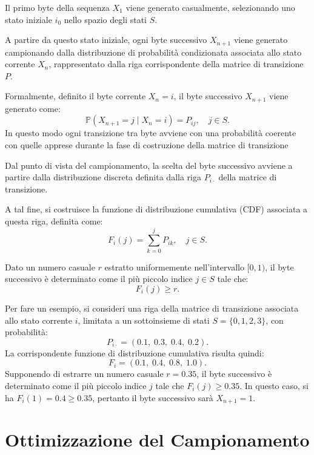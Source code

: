 \documentclass{report}
\begin{document}
\bigskip

Il primo byte della sequenza \(X_1\) viene generato casualmente, selezionando uno stato iniziale \(i_0\)
nello spazio degli stati \(S\).

A partire da questo stato iniziale, ogni byte successivo \(X_{n+1}\) viene generato campionando dalla
distribuzione di probabilità condizionata associata allo stato corrente \(X_n\), 
rappresentato dalla riga corrispondente della matrice di transizione \(P\).

\bigskip

Formalmente, definito il byte corrente \(X_n = i\), il byte successivo \(X_{n+1}\) viene generato come:
\[
\mathbb{P}(X_{n+1} = j \mid X_n = i) = P_{ij}, \quad j \in S.
\]
In questo modo ogni transizione tra byte avviene con
una probabilità coerente con quelle apprese durante la fase di costruzione della
matrice di transizione

\bigskip

Dal punto di vista del campionamento, la scelta del byte successivo avviene a partire 
dalla distribuzione discreta definita dalla riga \(P_{i\cdot}\) della
matrice di transizione.

A tal fine, si costruisce la funzione di distribuzione cumulativa (CDF) associata a questa riga, definita come:
\[
F_i(j) = \sum_{k = 0}^{j} P_{ik}, \quad j \in S.
\]

Dato un numero casuale \(r\) estratto uniformemente nell'intervallo \([0, 1)\),
il byte successivo è determinato come il più piccolo indice \(j \in S\) tale che:
\[
F_i(j) \geq r.
\]

\bigskip

Per fare un esempio, si consideri una riga della matrice di transizione
associata allo stato corrente \(i\), limitata a un sottoinsieme di stati
\(S = \{0,1,2,3\}\), con probabilità:
\[
P_{i\cdot} = (0.1,\; 0.3,\; 0.4,\; 0.2).
\]
La corrispondente funzione di distribuzione cumulativa risulta quindi:
\[
F_i = (0.1,\; 0.4,\; 0.8,\; 1.0).
\]
Supponendo di estrarre un numero casuale \(r = 0.35\), il byte successivo è determinato come 
il più piccolo indice \(j\) tale che \(F_i(j) \geq 0.35\).
In questo caso, si ha \(F_i(1) = 0.4 \geq 0.35\), pertanto il byte successivo sarà \(X_{n+1} = 1\).



\section{Ottimizzazione del Campionamento}
\end{document}
